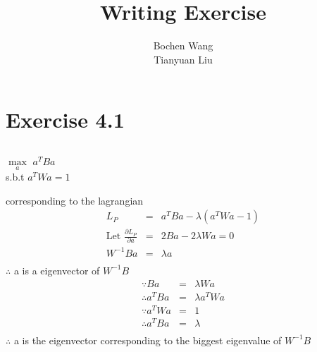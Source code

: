 \documentclass[a4paper]{article}
\begin{document}
\title{Writing Exercise}
\author{Bochen Wang\\Tianyuan Liu}
\maketitle
\section{Exercise 4.1}
\subsection{}
\begin{center}
$\underset{a}{\max }$ $a^TBa$\\
s.b.t $a^TWa = 1$ \\	
\end{center}
corresponding to the lagrangian \\	
\begin{eqnarray*}
	L_P &=& a^TBa - \lambda(a^TWa-1)\\
	\text{Let }\frac{\partial{L_P}}{\partial{a}} &=& 2Ba-2\lambda Wa = 0\\
	W^{-1}Ba &=& \lambda a\\
\end{eqnarray*}
$\therefore$ a is a eigenvector of $W^{-1}B$\\
\begin{eqnarray*}
	\because Ba &=& \lambda Wa \\
	\therefore a^TBa &=& \lambda a^TWa \\
	\because a^TWa &=& 1 \\
	\therefore a^TBa &=& \lambda \\		
\end{eqnarray*}
$\therefore$ a is the eigenvector corresponding to the biggest eigenvalue of $W^{-1}B$\\
\end{document}
